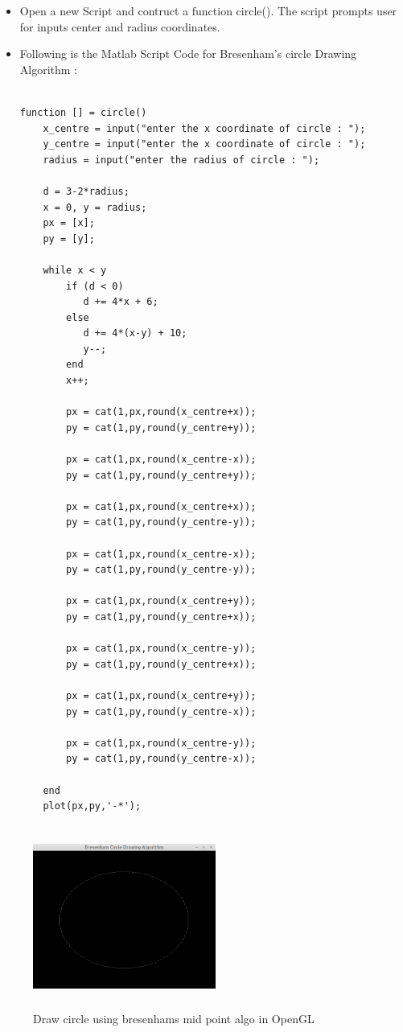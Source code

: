 \begin{itemize}

\item Open a new Script and contruct a function circle(). The script prompts user for inputs center and radius coordinates.

\item Following is the Matlab Script Code for Bresenham’s circle Drawing Algorithm :
\begin{lstlisting}

function [] = circle()
	x_centre = input("enter the x coordinate of circle : ");
	y_centre = input("enter the x coordinate of circle : ");
	radius = input("enter the radius of circle : ");

	d = 3-2*radius;
	x = 0, y = radius;
	px = [x];
	py = [y];

	while x < y
		if (d < 0)
		   d += 4*x + 6;
		else 
		   d += 4*(x-y) + 10;
		   y--;
		end
		x++;
		
		px = cat(1,px,round(x_centre+x));
		py = cat(1,py,round(y_centre+y));

		px = cat(1,px,round(x_centre-x));
		py = cat(1,py,round(y_centre+y));
		
		px = cat(1,px,round(x_centre+x));
		py = cat(1,py,round(y_centre-y));
		
		px = cat(1,px,round(x_centre-x));
		py = cat(1,py,round(y_centre-y));
		
		px = cat(1,px,round(x_centre+y));
		py = cat(1,py,round(y_centre+x));
		
		px = cat(1,px,round(x_centre-y));
		py = cat(1,py,round(y_centre+x));
		
		px = cat(1,px,round(x_centre+y));
		py = cat(1,py,round(y_centre-x));
		
		px = cat(1,px,round(x_centre-y));
		py = cat(1,py,round(y_centre-x));
		
	end
	plot(px,py,'-*');
\end{lstlisting}
\end{itemize}

\begin{figure}[ht!]
\centering
\includegraphics[width=60mm, height=60mm]{circleOpenGL.png}
\caption{Draw circle using bresenhams mid point algo in OpenGL \label{overflow}}
\end{figure}

